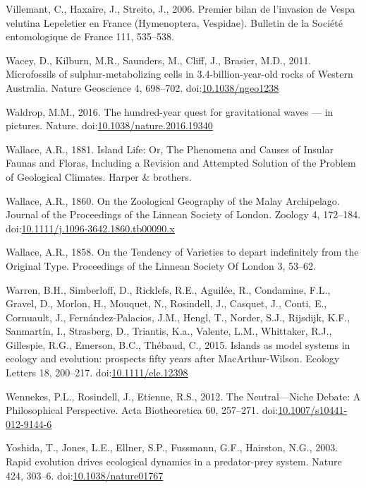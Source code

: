 \hypertarget{ref-Villemant2006}{}
Villemant, C., Haxaire, J., Streito, J., 2006. Premier bilan de
l'invasion de Vespa velutina Lepeletier en France (Hymenoptera,
Vespidae). Bulletin de la Société entomologique de France 111, 535--538.

\hypertarget{ref-Wacey2011}{}
Wacey, D., Kilburn, M.R., Saunders, M., Cliff, J., Brasier, M.D., 2011.
Microfossils of sulphur-metabolizing cells in 3.4-billion-year-old rocks
of Western Australia. Nature Geoscience 4, 698--702.
doi:\href{https://doi.org/10.1038/ngeo1238}{10.1038/ngeo1238}

\hypertarget{ref-Waldrop2016}{}
Waldrop, M.M., 2016. The hundred-year quest for gravitational waves ---
in pictures. Nature.
doi:\href{https://doi.org/10.1038/nature.2016.19340}{10.1038/nature.2016.19340}

\hypertarget{ref-wallace1881island}{}
Wallace, A.R., 1881. Island Life: Or, The Phenomena and Causes of
Insular Faunas and Floras, Including a Revision and Attempted Solution
of the Problem of Geological Climates. Harper \& brothers.

\hypertarget{ref-Wallace1860}{}
Wallace, A.R., 1860. On the Zoological Geography of the Malay
Archipelago. Journal of the Proceedings of the Linnean Society of
London. Zoology 4, 172--184.
doi:\href{https://doi.org/10.1111/j.1096-3642.1860.tb00090.x}{10.1111/j.1096-3642.1860.tb00090.x}

\hypertarget{ref-Wallace1858}{}
Wallace, A.R., 1858. On the Tendency of Varieties to depart indefinitely
from the Original Type. Proceedings of the Linnean Society Of London 3,
53--62.

\hypertarget{ref-Warren2015}{}
Warren, B.H., Simberloff, D., Ricklefs, R.E., Aguilée, R., Condamine,
F.L., Gravel, D., Morlon, H., Mouquet, N., Rosindell, J., Casquet, J.,
Conti, E., Cornuault, J., Fernández-Palacios, J.M., Hengl, T., Norder,
S.J., Rijsdijk, K.F., Sanmartín, I., Strasberg, D., Triantis, K.a.,
Valente, L.M., Whittaker, R.J., Gillespie, R.G., Emerson, B.C., Thébaud,
C., 2015. Islands as model systems in ecology and evolution: prospects
fifty years after MacArthur-Wilson. Ecology Letters 18, 200--217.
doi:\href{https://doi.org/10.1111/ele.12398}{10.1111/ele.12398}

\hypertarget{ref-Wennekes2012}{}
Wennekes, P.L., Rosindell, J., Etienne, R.S., 2012. The Neutral---Niche
Debate: A Philosophical Perspective. Acta Biotheoretica 60, 257--271.
doi:\href{https://doi.org/10.1007/s10441-012-9144-6}{10.1007/s10441-012-9144-6}

\hypertarget{ref-Yoshida2003}{}
Yoshida, T., Jones, L.E., Ellner, S.P., Fussmann, G.F., Hairston, N.G.,
2003. Rapid evolution drives ecological dynamics in a predator-prey
system. Nature 424, 303--6.
doi:\href{https://doi.org/10.1038/nature01767}{10.1038/nature01767}
